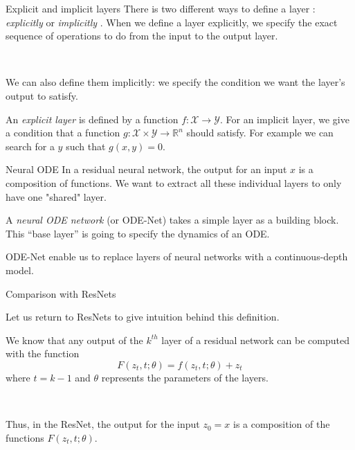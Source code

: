\documentclass[11pt]{beamer}
\begin{document}
\begin{frame}{Explicit and implicit layers}
There is two different ways to define a layer : \textit{explicitly} or \textit{implicitly} \cite{2}. When we define a layer explicitly, we specify the exact sequence of operations to do from the input to the output layer. 

~

We can also define them implicitly: we specify the condition we want the layer's output to satisfy. 

\begin{definition}
An \textit{explicit layer} is defined by a function $f : \mathcal{X} \rightarrow \mathcal{Y}$. For an implicit layer, we give a condition that a function $g: \mathcal{X} \times \mathcal{Y} \rightarrow \mathbb{R}^n$ should satisfy. For example we can search for a $y$ such that $g(x,y) = 0$.
\end{definition}
\end{frame}

\begin{frame}{Neural ODE}
In a residual neural network, the output for an input $x$ is a composition of functions. We want to extract all these individual layers to only have one "shared" layer.

\begin{definition}
A \textit{neural ODE network} (or ODE-Net) \cite{2,3,12} takes a simple layer as a building block. This “base layer” is going to specify the dynamics of an ODE.

\end{definition}
ODE-Net enable us to replace layers of neural networks with a continuous-depth model.
\end{frame}
\begin{frame}{Comparison with ResNets}

Let us return to ResNets to give intuition behind this definition. 

We know that any output of the $k^{th}$ layer of a residual network can be computed with the function
\begin{equation*}
F(z_t, t; \theta) = f(z_t, t;\theta) + z_t
\end{equation*}
where $t = k - 1$ and $\theta$ represents the parameters of the layers.

~

Thus, in the ResNet, the output for the input $z_0 = x$ is a composition of the functions $F(z_t, t; \theta)$.
\end{frame}
\end{document}
